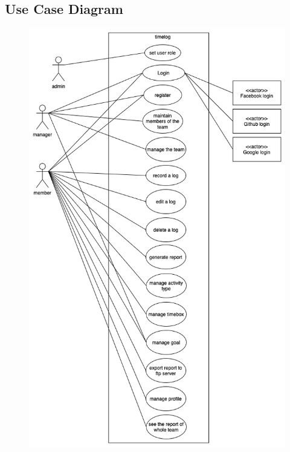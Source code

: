 \documentclass[12pt, a4paper]{article}
\begin{document}
\begin{CJK*}{UTF8}{bkai}
  \subsection{Use Case Diagram}
    \begin{figure}[h!]
      \centering
      \includegraphics[width=\linewidth]{img/usecase_diagram/Usecase_diagram.png}
    \end{figure}


\end{CJK*}
\end{document}
